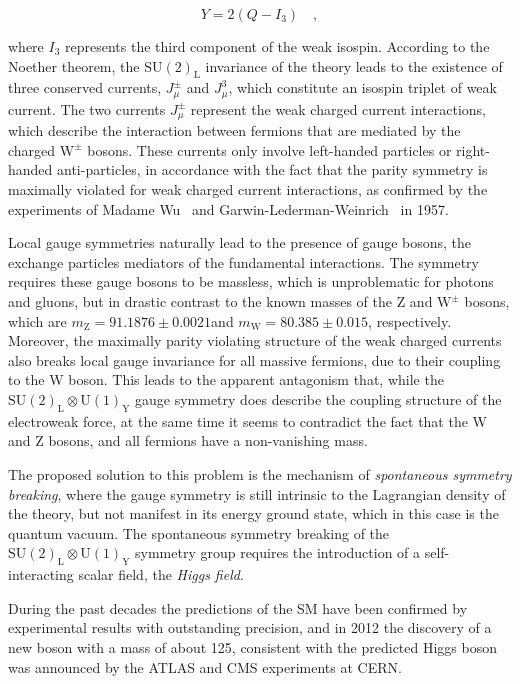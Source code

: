 \begin{equation}
Y = 2(Q - I_3) \quad,
\end{equation}

\noindent where $I_3$ represents the third component of the weak isospin. According to the Noether theorem, the $\mathrm{SU(2)_L}$ invariance of the theory leads to the existence of three conserved currents, $J_\mu^\pm$ and $J_\mu^3$, which constitute an isospin triplet of weak current. The two currents $J_\mu^\pm$ represent the weak charged current interactions, which describe the interaction between fermions that are mediated by the charged $\mathrm{W^\pm}$ bosons. These currents only involve left-handed particles or right-handed anti-particles, in accordance with the fact that the parity symmetry is maximally violated for weak charged current interactions, as confirmed by the experiments of Madame Wu~\cite{Wu:1957my} and Garwin-Lederman-Weinrich~\cite{Garwin:1957hc} in 1957.

Local gauge symmetries naturally lead to the presence of gauge bosons, the exchange particles mediators of the fundamental interactions. The symmetry requires these gauge bosons to be massless, which is unproblematic for photons and gluons, but in drastic contrast to the known masses of the Z and $\mathrm{W^\pm}$ bosons, which are $m_\mathrm{Z} = 91.1876 \pm 0.0021$\GeV and $m_\mathrm{W} = 80.385 \pm 0.015$\GeV, respectively. Moreover, the maximally parity violating structure of the weak charged currents also breaks local gauge invariance for all massive fermions, due to their coupling to the W boson. This leads to the apparent antagonism that, while the $\mathrm{SU(2)_L \otimes U(1)_Y}$ gauge symmetry does describe the coupling structure of the electroweak force, at the same time it seems to contradict the fact that the W and Z bosons, and all fermions have a non-vanishing mass. 

The proposed solution to this problem is the mechanism of \emph{spontaneous symmetry breaking}, where the gauge symmetry is still intrinsic to the Lagrangian density of the theory, but not manifest in its energy ground state, which in this case is the quantum vacuum. The spontaneous symmetry breaking of the $\mathrm{SU(2)_L \otimes U(1)_Y}$ symmetry group requires the introduction of a self-interacting scalar field, the \emph{Higgs field}.

During the past decades the predictions of the SM have been confirmed by experimental results with outstanding precision, and in 2012 the discovery of a new boson with a mass of about 125\GeV, consistent with the predicted Higgs boson was announced by the ATLAS and CMS experiments at CERN.




